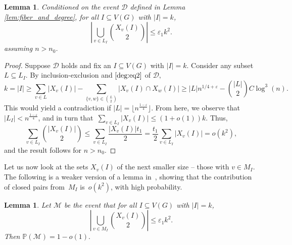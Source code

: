 \documentclass{article}
\newcommand{\p}{\mathbb{P}}
\newtheorem{lemma}[theorem]{Lemma}
\begin{document}
\begin{lemma} \label{lem:large} 
Conditioned on the event $\mathcal{D}$ defined in Lemma \ref{lem:fiber_and_degree}, for all $I \subseteq V(G)$ with $|I| = k$,
\[
\left| \bigcup_{v \in L_I} {X_{v}(I)\choose 2} \right|  \leq \varepsilon_1 k^2.  
\]
assuming $n>n_0$. 
\end{lemma} 
\begin{proof}
	Suppose $\mathcal{D}$ holds and fix an $I \subseteq V(G)$ with $|I| = k$. Consider any subset $L\subseteq L_I$. By inclusion-exclusion and $\eqref{deg:eq2}$ of $\mathcal{D},$
	\[
	k = |I| \geq \sum_{v \in L} |X_v(I)| - \sum_{\{v,w\} \in {L\choose 2}} |X_v(I) \cap X_{w}(I)| \geq |L|n^{1/4+\varepsilon} - \binom{|L|}{2}C\log^3(n). 
	\]
	This would yield a contradiction if $|L|=\lfloor n^{\frac{1-\varepsilon}{4}}\rfloor$.  From here, we observe that ~$|L_I| < n^{\frac{1-\varepsilon}{4}}$, and in turn that~$\sum_{v \in L_I} |X_v(I)| \leq (1+o(1))k.$  Thus,
    \[
	\sum_{v \in L_I} \binom{ |X_v(I)|}{2} \leq \sum_{v \in L_I} \frac{|X_v(I)| t_1}{2} = \frac{t_1}{2}\sum_{v \in L_I} |X_v(I)| = o(k^2),
	\] 
and the result follows for $n>n_0$. 
\end{proof}


Let us now look at the sets $X_v(I)$ of the next smaller size -- those with $v \in M_I$. 
The following is a weaker version of a lemma in~\cite{campos2025}, showing that the contribution of closed pairs from~$M_I$ is~$o(k^2)$, with high probability.

\begin{lemma} \label{lem:med} 
	Let $\mathcal{M}$ be the event that for all $I \subseteq V(G)$ with $|I|=k$,
	\begin{equation}
	\left| \bigcup_{v \in M_I} {X_{v}(I)\choose 2} \right|  \leq \varepsilon_1 k^2.  \label{eq:medcount}
	\end{equation} 
	Then $\p(\mathcal{M}) = 1-o(1).$
\end{lemma} 
\end{document}
